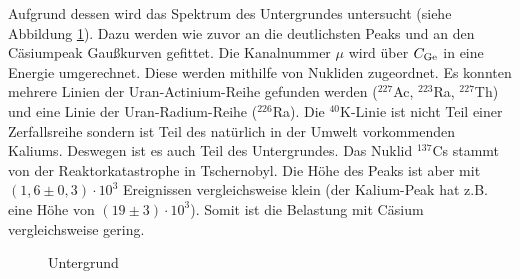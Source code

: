 Aufgrund dessen wird das Spektrum des Untergrundes untersucht (siehe Abbildung \ref{fig:unter}). Dazu werden wie zuvor an die deutlichsten Peaks und an den Cäsiumpeak Gaußkurven gefittet. Die Kanalnummer $\mu$ wird über $C_\mathrm{Ge}$ in eine Energie umgerechnet. Diese werden mithilfe von \cite{lara} Nukliden zugeordnet. Es konnten mehrere Linien der Uran-Actinium-Reihe gefunden werden ($^{227}$Ac, $^{223}$Ra, $^{227}$Th) und eine Linie der Uran-Radium-Reihe ($^{226}$Ra). Die $^{40}$K-Linie ist nicht Teil einer Zerfallsreihe sondern ist Teil des natürlich in der Umwelt vorkommenden Kaliums. Deswegen ist es auch Teil des Untergrundes. Das Nuklid $^{137}$Cs stammt von der Reaktorkatastrophe in Tschernobyl. Die Höhe des Peaks ist aber mit $(1,6 \pm 0,3) \cdot 10^3$ Ereignissen vergleichsweise klein (der Kalium-Peak hat z.B. eine Höhe von $(19 \pm 3)\cdot 10^3$). Somit ist die Belastung mit Cäsium vergleichsweise gering.

\begin{figure}[!h]
\centering
{}
\caption{Untergrund}
\label{fig:unter}
\end{figure}

